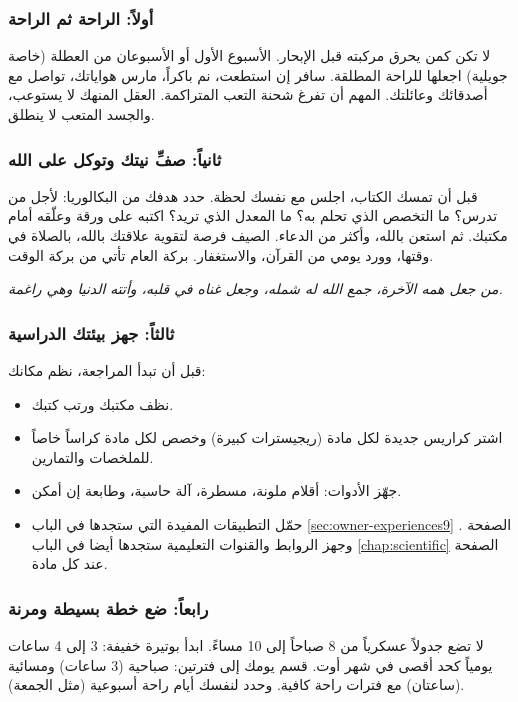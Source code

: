 \documentclass[12pt,a4paper]{book}
\newcommand{\quoteAr}[1]{%
	\begin{myquote}
		\itshape #1
	\end{myquote}
}
\begin{document}
	\subsubsection{أولاً: الراحة ثم الراحة}
	لا تكن كمن يحرق مركبته قبل الإبحار. الأسبوع الأول أو الأسبوعان من العطلة (خاصة جويلية) اجعلها للراحة المطلقة. سافر إن استطعت، نم باكراً، مارس هواياتك، تواصل مع أصدقائك وعائلتك. المهم أن تفرغ شحنة التعب المتراكمة. العقل المنهك لا يستوعب، والجسد المتعب لا ينطلق.
	
	\subsubsection{ثانياً: صفِّ نيتك وتوكل على الله}
	قبل أن تمسك الكتاب، اجلس مع نفسك لحظة. حدد هدفك من البكالوريا: لأجل من تدرس؟ ما التخصص الذي تحلم به؟ ما المعدل الذي تريد؟ اكتبه على ورقة وعلّقه أمام مكتبك. ثم استعن بالله، وأكثر من الدعاء. الصيف فرصة لتقوية علاقتك بالله، بالصلاة في وقتها، وورد يومي من القرآن، والاستغفار. بركة العام تأتي من بركة الوقت.
	
	\quoteAr{من جعل همه الآخرة، جمع الله له شمله، وجعل غناه في قلبه، وأتته الدنيا وهي راغمة.}
	
	\subsubsection{ثالثاً: جهز بيئتك الدراسية}
	قبل أن تبدأ المراجعة، نظم مكانك:
	\begin{itemize}
		\item نظف مكتبك ورتب كتبك.
		\item اشتر كراريس جديدة لكل مادة (ريجيسترات كبيرة) وخصص لكل مادة كراساً خاصاً للملخصات والتمارين.
		\item جهّز الأدوات: أقلام ملونة، مسطرة، آلة حاسبة، وطابعة إن أمكن.
		\item حمّل التطبيقات المفيدة التي ستجدها في الباب \ref{sec:owner-experiences9} الصفحة \pageref{sec:owner-experiences9}. وجهز الروابط والقنوات التعليمية ستجدها أيضا في الباب  \ref{chap:scientific} الصفحة \pageref{chap:scientific} عند كل مادة.
	\end{itemize}

	\subsubsection{رابعاً: ضع خطة بسيطة ومرنة}
	لا تضع جدولاً عسكرياً من 8 صباحاً إلى 10 مساءً. ابدأ بوتيرة خفيفة: 3 إلى 4 ساعات يومياً كحد أقصى في شهر أوت. قسم يومك إلى فترتين: صباحية (3 ساعات) ومسائية (ساعتان) مع فترات راحة كافية. وحدد لنفسك أيام راحة أسبوعية (مثل الجمعة).
	
\end{document}
